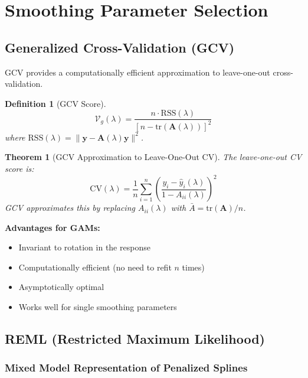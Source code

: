 \documentclass[12pt]{article}
\newtheorem{theorem}{Theorem}
\newtheorem{definition}{Definition}
\newcommand{\tr}{\text{tr}}
\begin{document}
\section{Smoothing Parameter Selection}

\subsection{Generalized Cross-Validation (GCV)}

GCV provides a computationally efficient approximation to leave-one-out cross-validation.

\begin{definition}[GCV Score]
\begin{equation}
\mathcal{V}_g(\lambda) = \frac{n \cdot \text{RSS}(\lambda)}{[n - \tr(\mathbf{A}(\lambda))]^2}
\end{equation}
where $\text{RSS}(\lambda) = \|\mathbf{y} - \mathbf{A}(\lambda)\mathbf{y}\|^2$.
\end{definition}

\begin{theorem}[GCV Approximation to Leave-One-Out CV]
The leave-one-out CV score is:
\begin{equation}
\text{CV}(\lambda) = \frac{1}{n}\sum_{i=1}^n \left(\frac{y_i - \hat{y}_i(\lambda)}{1 - A_{ii}(\lambda)}\right)^2
\end{equation}
GCV approximates this by replacing $A_{ii}(\lambda)$ with $\bar{A} = \tr(\mathbf{A})/n$.
\end{theorem}

\textbf{Advantages for GAMs:}
\begin{itemize}
    \item Invariant to rotation in the response
    \item Computationally efficient (no need to refit $n$ times)
    \item Asymptotically optimal
    \item Works well for single smoothing parameters
\end{itemize}

\subsection{REML (Restricted Maximum Likelihood)}

\subsubsection{Mixed Model Representation of Penalized Splines}
\end{document}
